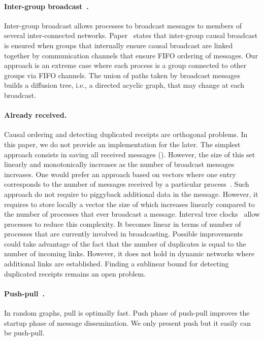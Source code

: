 
\paragraph{Inter-group
  broadcast~\cite{johnson1998scalable,johnson1999intergroup}.} Inter-group
broadcast allows processes to broadcast messages to members of several
inter-connected networks. Paper~\cite{johnson1999intergroup} states that
inter-group causal broadcast is ensured when groups that internally ensure
causal broadcast are linked together by communication channels that ensure FIFO
ordering of messages. Our approach is an extreme case where each process is a
group connected to other groups via FIFO channels. The union of paths taken by
broadcast messages builds a diffusion tree, i.e., a directed acyclic graph, that
may change at each broadcast.

\paragraph{Already received.} Causal ordering and detecting duplicated receipts
are orthogonal problems. In this paper, we do not provide an implementation for
the later. The simplest approach consists in saving all received messages
(\REF). However, the size of this set linearly and monotonically increases as
the number of broadcast messages increases. One would prefer an approach based
on vectors where one entry corresponds to the number of messages received by a
particular process~\cite{fidge1988timestamps}. Such approach do not require to
piggyback additional data in the message. However, it requires to store locally
a vector the size of which increases linearly compared to the number of
processes that ever broadcast a message. Interval tree
clocks~\cite{almeida2008interval} allow processes to reduce this complexity. It
becomes linear in terms of number of processes that are currently involved in
broadcasting. Possible improvements could take advantage of the fact that the
number of duplicates is equal to the number of incoming links. However, it does
not hold in dynamic networks where additional links are established. Finding a
sublinear bound for detecting duplicated receipts remains an open problem.

\paragraph{Push-pull~\cite{mercier2017optimal}.} In random graphs, pull is
optimally fast. Push phase of push-pull improves the startup phase of message
dissemination. We only present push but it easily can be push-pull. 


